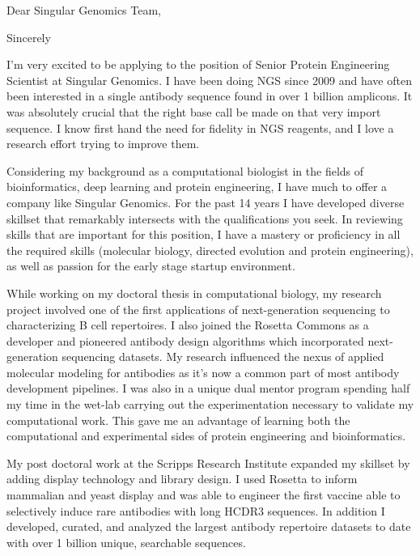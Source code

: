 \documentclass[11pt,a4paper,sans]{moderncv}        %
\title{}                               %
\begin{document}
\date{2020}
\opening{Dear Singular Genomics Team,}
\closing{Sincerely}
\makelettertitle
\justify
I'm very excited to be applying to the position of Senior Protein Engineering Scientist at Singular Genomics. I have been doing NGS since 2009 and have often been interested in a single antibody sequence found in over 1 billion amplicons. It was absolutely crucial that the right base call be made on that very import sequence. I know first hand the need for fidelity in NGS reagents, and I love a research effort trying to improve them. 

Considering my background as a computational biologist in the fields of bioinformatics, deep learning and protein engineering, I have much to offer a company like Singular Genomics.
For the past 14 years I have developed diverse skillset that remarkably intersects with the qualifications you seek. In reviewing skills that are important for this position, I have a mastery or proficiency in all the required skills (molecular biology, directed evolution and protein engineering), as well as passion for the early stage startup environment.

While working on my doctoral thesis in computational biology, my research project involved one of the first applications of next-generation sequencing to characterizing B cell repertoires. 
I also joined the Rosetta Commons as a developer and pioneered antibody design algorithms which incorporated next-generation sequencing datasets. My research influenced the nexus of applied molecular modeling for antibodies as it's now a common part of most antibody development pipelines. I was also in a unique dual 
mentor program spending half my time in the wet-lab carrying out the experimentation necessary to validate my computational work. This gave me an advantage 
of learning both the computational and experimental sides of protein engineering and bioinformatics.

My post doctoral work at the Scripps Research Institute expanded my skillset by adding display technology and library design. I used Rosetta to inform mammalian and yeast  display and was able to engineer the first vaccine able to selectively induce rare antibodies with long HCDR3 sequences.  In addition I developed, curated, and analyzed the largest antibody repertoire datasets to date with over 1 billion unique, searchable sequences.
\end{document}
